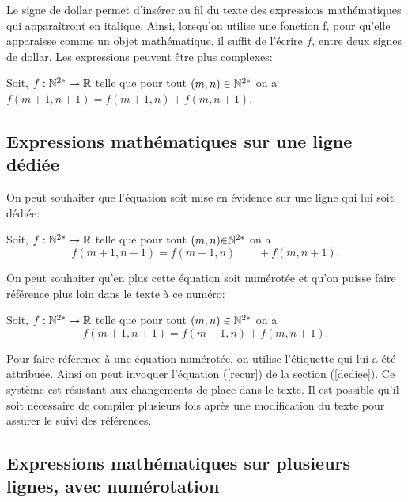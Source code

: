 \documentclass[10pt]{article}
\begin{document}
Le signe de dollar permet d'insérer au fil du texte des expressions
mathématiques qui apparaîtront en italique. Ainsi, lorsqu'on utilise une
fonction f, pour qu'elle apparaisse comme un objet mathématique, il
suffit de l'écrire \(f\), entre deux signes de dollar. Les expressions
peuvent être plus complexes:

Soit, \(f: \Bbb{N}^{2*} \rightarrow \Bbb{R}\) telle que pour tout
\((m,n) \in \Bbb{N}^{2*}\) on a \(f(m+1,n+1) = f(m+1,n) + f(m,n+1)\).

\hypertarget{expressions-mathuxe9matiques-sur-une-ligne-duxe9diuxe9e}{%
\subsection{\texorpdfstring{Expressions mathématiques sur une ligne
dédiée
\label{dediee}}{Expressions mathématiques sur une ligne dédiée }}\label{expressions-mathuxe9matiques-sur-une-ligne-duxe9diuxe9e}}

On peut souhaiter que l'équation soit mise en évidence sur une ligne qui
lui soit dédiée:

Soit, \(f: \Bbb{N}^{2*} \rightarrow \Bbb{R}\) telle que pour tout
\((m, n) {\in} \Bbb{N}^{2*}\) on a \begin{equation*}
f(m+1,n+1) = f(m+1,n) \qquad+ f(m,n+1).
\end{equation*}

On peut souhaiter qu'en plus cette équation soit numérotée et qu'on
puisse faire référence plus loin dans le texte à ce numéro:

Soit, \(f:\Bbb{N}^{2*} \rightarrow \Bbb{R}\) telle que pour tout
\((m,n) \in \Bbb{N}^{2*}\) on a \begin{equation}
f(m+1,n+1) = f(m+1,n) + f(m,n+1). \label{recur}
\end{equation}

Pour faire référence à une équation numérotée, on utilise l'étiquette
qui lui a été attribuée. Ainsi on peut invoquer l'équation (\ref{recur})
de la section (\ref{dediee}). Ce système est résistant aux changements
de place dans le texte. Il est possible qu'il soit nécessaire de
compiler plusieurs fois après une modification du texte pour assurer le
suivi des références.

\hypertarget{expressions-mathuxe9matiques-sur-plusieurs-lignes-avec-numuxe9rotation}{%
\subsection{\texorpdfstring{Expressions mathématiques sur plusieurs
lignes, avec numérotation
\label{numero}}{Expressions mathématiques sur plusieurs lignes, avec numérotation }}\label{expressions-mathuxe9matiques-sur-plusieurs-lignes-avec-numuxe9rotation}}
\end{document}
